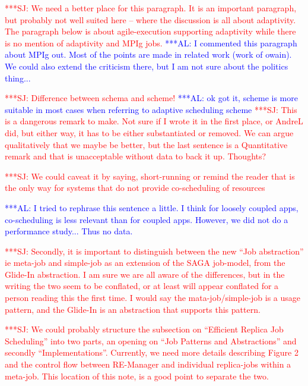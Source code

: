 \documentclass{rspublic}
\newcommand{\alnote}[1]{ {\textcolor{blue} { ***AL: #1 }}}
\newcommand{\jhanote}[1]{ {\textcolor{red} { ***SJ: #1 }}}
\newcommand{\alnote}[1]{}
\newcommand{\jhanote}[1]{}
\newcommand{\glidein}[1]{Glide-In }
\newcommand{\remanager}[1]{RE-Manager }
\begin{document}

\jhanote{We need a better place for this paragraph. It is an important
  paragraph, but probably not well suited here -- where the discussion
  is all about adaptivity. The paragraph below is about
  agile-execution supporting adaptivity while there is no mention of
  adaptivity and MPIg jobs.}
\alnote{I commented this paragraph about MPIg out. Most of the points are
made in related work (work of owain). We could also extend the criticism
there, but I am not sure about the politics thing...}  

\jhanote{Difference between schema and scheme!}
\alnote{ok got it, scheme is more suitable in most cases when referring to adaptive
scheduling scheme}
\jhanote{This is a dangerous remark to
  make. Not sure if I wrote it in the first place, or AndreL did, but
  either way, it has to be either substantiated or removed. We can
  argue qualitatively that we maybe be better, but the last sentence
  is a Quantitative remark and that is unacceptable without data to
  back it up. Thoughts?}

\jhanote{We could caveat it by saying, short-running or remind the
  reader that is the only way for systems that do not provide
  co-scheduling of resources}

\alnote{I tried to rephrase this sentence a little. I think for loosely coupled
apps, co-scheduling is less relevant than for coupled apps. However,
we did not do a performance study... Thus no data.}   

\jhanote{Secondly, it is important to distinguish between the new
  ``Job abstraction'' ie meta-job and simple-job as an extension of
  the SAGA job-model, from the \glidein\ abstraction. I am sure we are
  all aware of the differences, but in the writing the two seem to be
  conflated, or at least will appear conflated for a person reading
  this the first time. I would say the mata-job/simple-job is a usage
  pattern, and the \glidein\ is an abstraction that supports this
  pattern.}

\jhanote{We could probably structure the subsection on ``Efficient
  Replica Job Scheduling'' into two parts, an opening on ``Job
  Patterns and Abstractions'' and secondly
  ``Implementations''. Currently, we need more details describing
  Figure 2 and the control flow between \remanager\ and individual
  replica-jobs within a meta-job. This location of this note, is a
  good point to separate the two.}    
\end{document}
